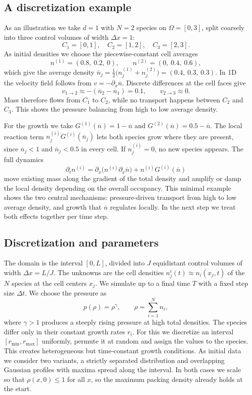 \documentclass[11pt]{article}
\newcommand{\nbar}{\overline{n}}
\begin{document}
\subsection{A discretization example}
As an illustration we take $d = 1$ with $N = 2$ species on $\Omega = [0, 3]$,
split coarsely into three control volumes of width $\Delta x = 1$:
\[
    C_1 = [0, 1], \quad C_2 = [1, 2], \quad C_3 = [2, 3].
\]
As initial densities we choose the piecewise-constant cell averages
\[
    n^{(1)} = (0.8,\ 0.2,\ 0), \qquad n^{(2)} = (0,\ 0.4,\ 0.6),
\]
which give the average density $\nbar_j = \tfrac{1}{2}\bigl(n^{(1)}_j +
n^{(2)}_j\bigr) = (0.4,\ 0.3,\ 0.3)$. In 1D the velocity field follows from $v =
-\partial_x \nbar$. Discrete differences at the cell faces give
\[
    v_{1 \to 2} \approx -(\nbar_2 - \nbar_1) = 0.1, \qquad v_{2 \to 3} \approx 0.
\]
Mass therefore flows from $C_1$ to $C_2$, while no transport happens between $C_2$
and $C_3$. This shows the pressure balancing from high to low average density.

For the growth we take $G^{(1)}(\nbar) = 1 - \nbar$ and $G^{(2)}(\nbar) = 0.5 -
\nbar$. The local reaction term $n^{(i)}_j G^{(i)}(\nbar_j)$ lets both species grow
where they are present, since $\nbar_j < 1$ and $\nbar_j < 0.5$ in every cell. If
$n^{(i)}_j = 0$, no new species appears. The full dynamics
\[
    \partial_t n^{(i)} = \partial_x\bigl( n^{(i)} \partial_x \nbar \bigr)
    + n^{(i)} G^{(i)}(\nbar)
\]
move existing mass along the gradient of the total density and amplify or damp the
local density depending on the overall occupancy. This minimal example shows the
two central mechanisms: pressure-driven transport from high to low average
density, and growth that $\nbar$ regulates locally. In the next step we treat both
effects together per time step.

\subsection{Discretization and parameters}
The domain is the interval $[0, L]$, divided into $J$ equidistant control volumes
of width $\Delta x = L / J$. The unknowns are the cell densities $n^{i}_j(t)
\approx n_i(x_j, t)$ of the $N$ species at the cell centers $x_j$. We simulate up
to a final time $T$ with a fixed step size $\Delta t$. We choose the pressure as
\begin{equation}
    p(\rho) = \rho^\gamma, \qquad \rho = \sum_{i=1}^{N} n_i,
\end{equation}
where $\gamma > 1$ produces a steeply rising pressure at high total densities. The
species differ only in their constant growth rates $r_i$. For this we discretize
an interval $[r_{\min}, r_{\max}]$ uniformly, permute it at random and assign the
values to the species. This creates heterogeneous but time-constant growth
conditions. As initial data we consider two variants, a strictly separated
distribution and overlapping Gaussian profiles with maxima spread along the
interval. In both cases we scale so that $\rho(x, 0) \le 1$ for all $x$, so the
maximum packing density already holds at the start.
\end{document}
